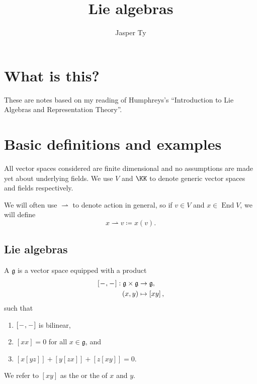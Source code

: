 \documentclass{article}
\title{Lie algebras}
\author{Jasper Ty}
\date{}
\newcommand*\wc{{\mkern 1mu-\mkern 1mu}}
\newcommand{\lb}[1]{\ensuremath{\left[{#1}\right]}}
\DeclareMathOperator{\End}{End}
\newcommand{\frkg}{{\ensuremath{\mathfrak{g}}}}
\begin{document}
\maketitle

\section*{What is this?}

These are notes based on my reading of Humphreys's ``Introduction to Lie Algebras and Representation Theory''.

\tableofcontents

\newpage

\section{Basic definitions and examples}

\begin{convention}
    All vector spaces considered are finite dimensional and no assumptions are made yet about underlying fields.
    We use $V$ and $\KK$ to denote generic vector spaces and fields respectively.

    We will often use $\rightharpoonup$ to denote action in general, so if $v \in V$ and $x \in \End V$, we will define
    \[
        x \rightharpoonup v
        \coloneq
        x(v).
    \]
\end{convention}

\subsection{Lie algebras}

\begin{definition}
    A  $\frkg$ is a vector space equipped with a product
    \begin{align*}
        \lb{\wc,\wc}: \frkg \times \frkg
        &\to
        \frkg,
        \\
        (x,y)
        &\mapsto
        \lb{xy},
    \end{align*}
    such that
    \begin{enumerate}[label=(L\arabic*)]
        \item 
            \label{ax:LBIsBilinear}
            $\lb{\wc,\wc}$ is bilinear,
        \item 
            \label{ax:LBNilpotent}
            $\lb{xx} = 0$ for all $x \in \frkg$, and
        \item 
            \label{ax:LBJacobiIdentity}
            $\lb{x\lb{yz}} + \lb{y\lb{zx}} + \lb{z\lb{xy}} = 0$.
    \end{enumerate}
    We refer to $\lb{xy}$ as the  or the  of $x$ and $y$.
\end{definition}
\end{document}
